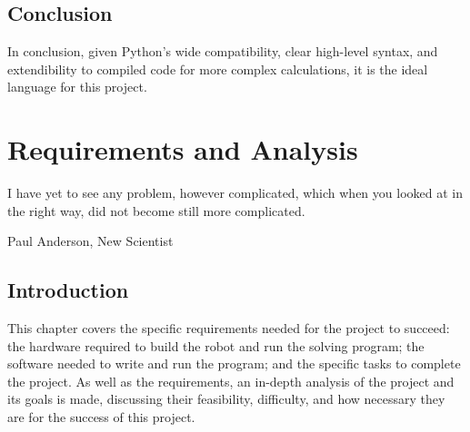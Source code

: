 \documentclass{report}
\begin{document}
    \section{Conclusion}
    In conclusion, given Python's wide compatibility, clear high-level syntax, and extendibility to compiled code for more complex calculations, it is the ideal language for this project.
   
    \newpage
    \chapter{Requirements and Analysis}
    \epigraph{I have yet to see any problem, however complicated, which when you looked at in the right way, did not become still more complicated.}{Paul Anderson, New Scientist \cite{Anderson1969}}
    
    \section{Introduction} %
    This chapter covers the specific requirements needed for the project to succeed: the hardware required to build the robot and run the solving program; the software needed to write and run the program; and the specific tasks to complete the project. As well as the requirements, an in-depth analysis of the project and its goals is made, discussing their feasibility, difficulty, and how necessary they are for the success of this project.
    
\end{document}
